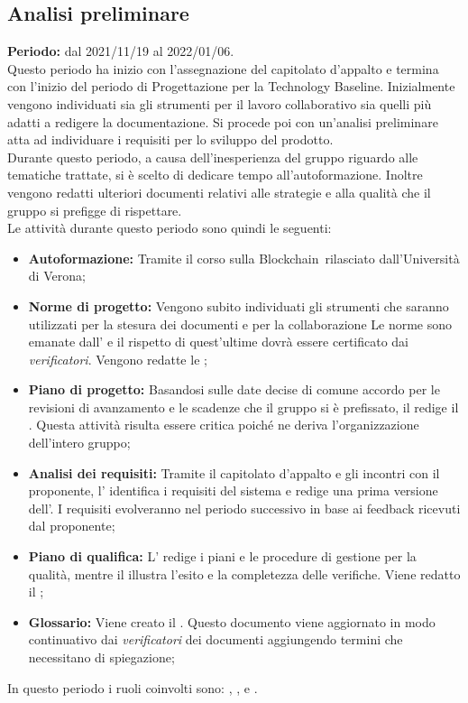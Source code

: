 \subsection{Analisi preliminare} \label{subsection:pianificazione_Analisi}
\textbf{Periodo:} dal 2021/11/19 al 2022/01/06.
\bigskip
\\Questo periodo ha inizio con l'assegnazione del capitolato d'appalto e termina con l'inizio del periodo di Progettazione per la Technology Baseline\glo.
Inizialmente vengono individuati sia gli strumenti per il lavoro collaborativo sia quelli più adatti a redigere la documentazione.
Si procede poi con un'analisi preliminare atta ad individuare i requisiti per lo sviluppo del prodotto.
\\Durante questo periodo, a causa dell'inesperienza del gruppo riguardo alle tematiche trattate, si è scelto di dedicare tempo all'autoformazione.
Inoltre vengono redatti ulteriori documenti relativi alle strategie e alla qualità che il gruppo \groupName si prefigge di rispettare.
\\Le attività durante questo periodo sono quindi le seguenti:
\begin{itemize}
  \item \textbf{Autoformazione:} Tramite il corso sulla Blockchain\glo\ rilasciato dall'Università di Verona;
  \item \textbf{Norme di progetto:} Vengono subito individuati gli strumenti che saranno utilizzati per la stesura dei documenti e per la collaborazione
  Le norme sono emanate dall'\roleAdministratorLow{} e il rispetto di quest'ultime dovrà essere certificato dai \textit{verificatori}. Vengono redatte le \docNameNdP{};
  \item \textbf{Piano di progetto:} Basandosi sulle date decise di comune accordo per le revisioni di avanzamento e le scadenze che il gruppo si è prefissato, il \roleProjectManager{} redige il \docNamePdP{}.
  Questa attività risulta essere critica poiché ne deriva l'organizzazione dell'intero gruppo;
  \item \textbf{Analisi dei requisiti:} Tramite il capitolato d'appalto e gli incontri con il proponente, l'\roleAnalystLow{} identifica i requisiti del sistema e redige una prima versione dell'\docNameAdR{}.
  I requisiti evolveranno nel periodo successivo in base ai feedback ricevuti dal proponente;
  \item \textbf{Piano di qualifica:} L'\roleAdministratorLow{} redige i piani e le procedure di gestione per la qualità, mentre il \roleVerifierLow{} illustra l'esito e la completezza delle verifiche. Viene redatto il \docNamePdQ{};
  \item \textbf{Glossario:} Viene creato il \docNameGlo. Questo documento viene aggiornato in modo continuativo dai \textit{verificatori} dei documenti aggiungendo termini che necessitano di spiegazione;
\end{itemize}
In questo periodo i ruoli coinvolti sono: \roleProjectManagerLow{}, \roleAdministratorLow{}, \roleAnalystLow{} e \roleVerifierLow{}.

